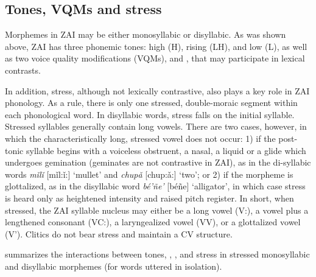 \subsection{Tones, VQMs and stress}\label{tones}

Morphemes in ZAI may be either monosyllabic or disyllabic. As was shown above, ZAI has three phonemic tones: high (H), rising (LH), and low (L), as well as two voice quality modifications (VQMs),  and , that may participate in lexical contrasts. 

In addition, stress, although not lexically contrastive, also plays a key role in ZAI phonology. As a rule, there is only one stressed, double-moraic segment within each phonological word. In disyllabic words, stress falls on the initial syllable. Stressed syllables generally contain long vowels. There are two cases, however, in which the characteristically long, stressed vowel does not occur: 1) if the post-tonic syllable begins with a voiceless obstruent, a nasal, a liquid or a glide which undergoes gemination (geminates are not contrastive in ZAI), as in the di-syllabic words \textit{m\v{i}l\v{i}} [m\v{i}l:\v{i}:] `mullet' and \textit{chup\v{a}} [chup:\v{a}:] `two'; or 2) if the morpheme is glottalized, as in the disyllabic word \textit{b\'{e}'ñe'} [b\'{e}ñe] `alligator', in which case stress is heard only as heightened intensity and raised pitch register. In short, when stressed, the ZAI syllable nucleus may either be a long vowel (V:), a vowel plus a lengthened consonant (VC:), a laryngealized vowel (VV), or a glottalized vowel (V'). Clitics do not bear stress and maintain a CV structure.

 summarizes the interactions between tones, , , and stress in stressed monosyllabic and disyllabic morphemes (for words uttered in isolation).

